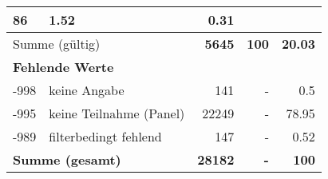 \begin{longtable}{lXrrr}
       \num{86} &
       \num[round-mode=places,round-precision=2]{1.52} &
         \num[round-mode=places,round-precision=2]{0.31} \\
     \midrule
     \multicolumn{2}{l}{Summe (gültig)} &
       \textbf{\num{5645}} &
     \textbf{\num{100}} &
       \textbf{\num[round-mode=places,round-precision=2]{20.03}} \\
     \multicolumn{5}{l}{\textbf{Fehlende Werte}}\\
       -998 &
       keine Angabe &
         \num{141} &
        - &
         \num[round-mode=places,round-precision=2]{0.5} \\
       -995 &
       keine Teilnahme (Panel) &
         \num{22249} &
        - &
         \num[round-mode=places,round-precision=2]{78.95} \\
       -989 &
       filterbedingt fehlend &
         \num{147} &
        - &
         \num[round-mode=places,round-precision=2]{0.52} \\
     \midrule
     \multicolumn{2}{l}{\textbf{Summe (gesamt)}} &
          \textbf{\num{28182}} &
        \textbf{-} &
        \textbf{\num{100}} \\
     \bottomrule
     \end{longtable}
     
